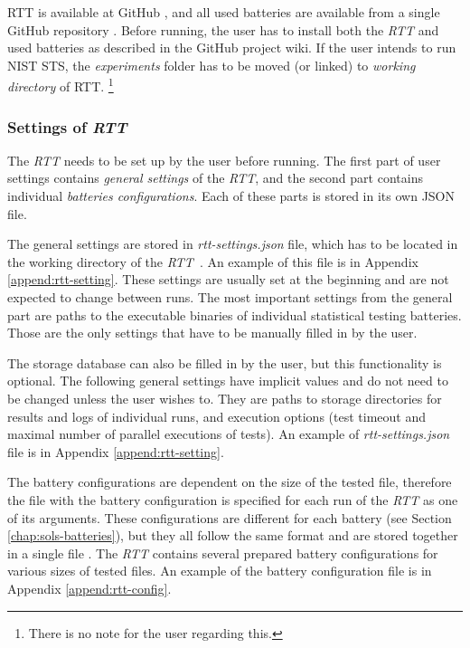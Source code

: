 \documentclass[
  digital,     %
  oneside,     %
  nosansbold,  %
  nocolorbold, %
  nolof,         %
  nolot,         %
]{fithesis4}
\begin{document}
RTT is available at GitHub \cite{rtt-site}, and all used batteries are available from a single GitHub repository \cite{rtt-batteries}. Before running, the user has to install both the \emph{RTT} and used batteries as described in the GitHub project wiki. If the user intends to run NIST STS, the \emph{experiments} folder has to be moved (or linked) to \emph{working directory} of RTT. \footnote{There is no note for the user regarding this.}

\subsubsection{Settings of \emph{RTT}}\label{rtt-settings} 
The \emph{RTT} needs to be set up by the user before running. The first part of user settings contains \emph{general settings} of the \emph{RTT}, and the second part contains individual \emph{batteries configurations}. Each of these parts is stored in its own JSON file. 

The general settings are stored in \emph{rtt-settings.json} file, which has to be located in the working directory of the \emph{RTT}~\cite[p.~10]{rtt-obratil}. An example of this file is in Appendix \ref{append:rtt-setting}. These settings are usually set at the beginning and are not expected to change between runs. The most important settings from the general part are paths to the executable binaries of individual statistical testing batteries. Those are the only settings that have to be manually filled in by the user.

The storage database can also be filled in by the user, but this functionality is optional. The following general settings have implicit values and do not need to be changed unless the user wishes to. They are paths to storage directories for results and logs of individual runs, and execution options (test timeout and maximal number of parallel executions of tests). An example of \emph{rtt-settings.json} file is in Appendix \ref{append:rtt-setting}.

The battery configurations are dependent on the size of the tested file, therefore the file with the battery configuration is specified for each run of the \emph{RTT} as one of its arguments. These configurations are different for each battery (see Section \ref{chap:sols-batteries}), but they all follow the same format and are stored together in a single file \cite[p.~11]{rtt-obratil}. The \emph{RTT} contains several prepared battery configurations for various sizes of tested files. An example of the battery configuration file is in Appendix \ref{append:rtt-config}.
\end{document}
